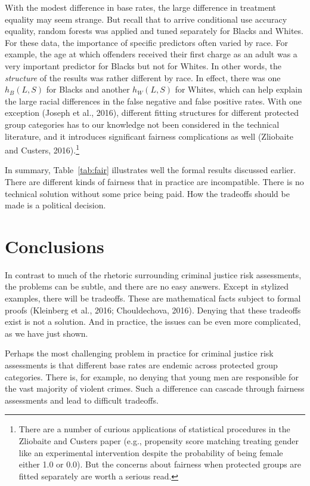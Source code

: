 \documentclass[12pt]{article}
\begin{document}
With the modest difference in base rates, the large difference in treatment equality may seem strange. But recall that to arrive conditional use accuracy equality, random forests was applied and tuned separately for Blacks and Whites. For these data, the importance of specific predictors often varied by race. For example, the age at which offenders received their first charge as an adult was a very important predictor for Blacks but not for Whites. In other words, the \textit{structure} of the results was rather different by race. In effect, there was one $h_{B}(L,S)$ for Blacks and another $h_{W}(L,S)$ for Whites, which can help explain the large racial differences in the false negative and false positive rates. With one exception (Joseph et al., 2016), different fitting structures for different protected group categories has to our knowledge not been considered in the technical literature, and it introduces significant fairness complications as well (Zliobaite and Custers, 2016).\footnote
{
There are a number of curious applications of statistical procedures in the Zliobaite and Custers paper (e.g., propensity score matching treating gender like an experimental intervention despite the probability of being female either 1.0 or 0.0). But the concerns about fairness when protected groups are fitted separately are worth a serious read.
} 

In summary, Table~\ref{tab:fair} illustrates well the formal results discussed earlier. There are different kinds of fairness that in practice are incompatible. There is no technical solution without some price being paid. How the tradeoffs should be made is a political decision. 

\section{Conclusions}

In contrast to much of the rhetoric surrounding criminal justice risk assessments, the problems can be subtle, and there are no easy answers. Except in stylized examples, there will be tradeoffs. These are mathematical facts subject to formal proofs (Kleinberg et al., 2016; Chouldechova, 2016). Denying that these tradeoffs exist is not a solution. And in practice, the issues can be even more complicated, as we have just shown. 

Perhaps the most challenging problem in practice for criminal justice risk assessments is that different base rates are endemic across protected group categories. There is, for example, no denying that young men are responsible for the vast majority of violent  crimes. Such a difference can cascade through fairness assessments and lead to difficult tradeoffs. 
\end{document}
